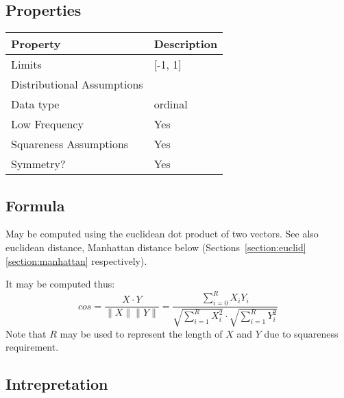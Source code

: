 \documentclass[11pt]{article}
\begin{document}
\subsection{Properties}
\begin{tabular}{| l || l |}
    \hline
    {\bf Property} & {\bf Description} \\
    \hline
    Limits & [-1, 1] \\ \hline

    Distributional Assumptions&  \\ \hline

    Data type & ordinal \\ \hline

    Low Frequency & Yes \\ \hline

    Squareness Assumptions & Yes \\ \hline
    
    Symmetry? & Yes \\ \hline

\end{tabular}


\subsection{Formula}
May be computed using the euclidean dot product of two vectors.  See also euclidean distance, Manhattan distance below (Sections~\ref{section:euclid}\ref{section:manhattan} respectively).

It may be computed thus:
$$
cos = \frac{ X \cdot Y }{ \|X\|\|Y\| } = \frac{  \sum_{i=0}^{R}{ X_iY_i }  }{     \sqrt{ \sum_{i=1}^{R}{X_i^2} }  \cdot  \sqrt{ \sum_{i=1}^{R}{Y_i^2} }    }
$$
Note that $R$ may be used to represent the length of $X$ and $Y$ due to squareness requirement.


\subsection{Intrepretation}
\end{document}

